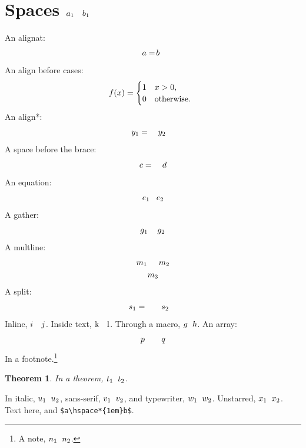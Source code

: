 \documentclass{article}
\newtheorem{theorem}{Theorem}
\newcommand{\gap}{\hspace*{2mm}}
\begin{document}
\tableofcontents
\section{Spaces $a_{1}\hspace*{1em}b_{1}$}
An alignat:
\begin{alignat}{1}
\hspace*{-2mm}a = \hspace*{-0.5mm} b
\end{alignat}
An align before cases:
\begin{align}
\hspace*{-2mm} f(x) = \begin{cases} 1 & x > 0, \\ 0 & \text{otherwise}. \end{cases}
\end{align}
An align*:
\begin{align*}
y_{1} &= \hspace*{1em} y_{2}
\end{align*}
A space before the brace:
\[ c = \hspace* {1em} d \]
An equation:
\begin{equation}
e_{1} \hspace*{3mm} e_{2}
\end{equation}
A gather:
\begin{gather}
g_{1} \hspace*{4mm} g_{2}
\end{gather}
A multline:
\begin{multline}
m_{1} \hspace*{5mm} m_{2} \\ m_{3}
\end{multline}
A split:
\begin{equation}
\begin{split}
s_{1} &= \hspace*{6mm} s_{2}
\end{split}
\end{equation}
Inline, $i\hspace*{1em}j$. Inside text, $\text{k\hspace*{1em}l}$. Through
a macro, $g \gap h$. An array:
\[ \begin{array}{c@{\hspace*{2em}}c} p & q \end{array} \]
In a footnote.\footnote{A note, $n_{1}\hspace*{2mm}n_{2}$.}
\begin{theorem}
In a theorem, $t_{1}\hspace*{2mm}t_{2}$.
\end{theorem}
In italic, \emph{$u_{1}\hspace*{2mm}u_{2}$}, sans-serif,
\textsf{$v_{1}\hspace*{2mm}v_{2}$}, and typewriter,
\texttt{$w_{1}\hspace*{2mm}w_{2}$}. Unstarred, $x_{1}\hspace{2mm}x_{2}$.
Text \hspace*{1em} here, and \verb|$a\hspace*{1em}b$|.
\end{document}
